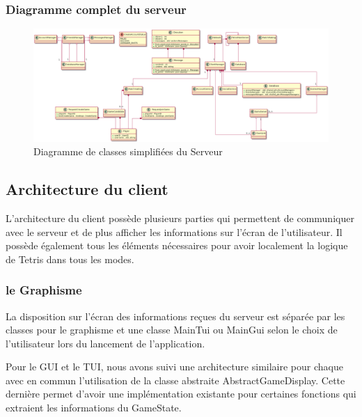 \documentclass{article}
\begin{document}
\subsubsection{Diagramme complet du serveur}

\begin{figure}[H]
	\centering
	 \includegraphics[scale=0.2]{../../res/uml/class/ServerStructureClass.png}
	 \caption{Diagramme de classes  simplifiées du Serveur}
	 \label{fig:WholeServerDiagram}
\end{figure}

\subsection{Architecture du client}

L'architecture du client possède plusieurs parties qui permettent de communiquer avec le serveur et de plus afficher les informations sur l'écran de l'utilisateur. Il possède également tous les éléments nécessaires pour avoir localement la logique de Tetris dans tous les modes.

\subsubsection{le Graphisme}

La disposition sur l'écran des informations reçues du serveur est séparée par les classes pour le graphisme et une classe MainTui ou MainGui selon le choix de l'utilisateur lors du lancement de l'application.


Pour le GUI et le TUI, nous avons suivi une architecture similaire pour chaque avec en commun l'utilisation de la classe abstraite AbstractGameDisplay. Cette dernière permet d'avoir une implémentation existante pour certaines fonctions qui extraient les informations du GameState. 
\end{document}
